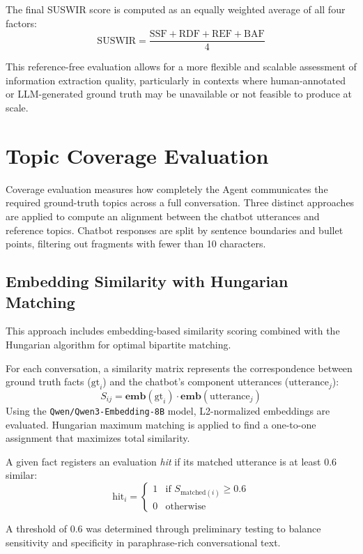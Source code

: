 The final SUSWIR score is computed as an equally weighted average of all four factors:
\[
    \text{SUSWIR} = \frac{\text{SSF} + \text{RDF} + \text{REF} + \text{BAF}}{4}
\]

This reference-free evaluation allows for a more flexible and scalable assessment of information extraction quality, particularly in contexts where human-annotated or LLM-generated ground truth may be unavailable or not feasible to produce at scale.

\section{Topic Coverage Evaluation}

Coverage evaluation measures how completely the Agent communicates the required ground-truth topics across a full conversation. 
Three distinct approaches are applied to compute an alignment between the chatbot utterances and reference topics. 
Chatbot responses are split by sentence boundaries and bullet points, filtering out fragments with fewer than 10 characters.

\subsection{Embedding Similarity with Hungarian Matching}

This approach includes embedding-based similarity scoring combined with the Hungarian algorithm for optimal bipartite matching.

For each conversation, a similarity matrix represents the correspondence between ground truth facts ($\text{gt}_i$) and the chatbot's component utterances ($\text{utterance}_j$):
\[
S_{ij} = \mathbf{emb}(\text{gt}_i) \cdot \mathbf{emb}(\text{utterance}_j)
\]
Using the \texttt{Qwen/Qwen3-Embedding-8B} model, L2-normalized embeddings are evaluated. 
Hungarian maximum matching is applied to find a one-to-one assignment that maximizes total similarity.

A given fact registers an evaluation \textit{hit} if its matched utterance is at least $0.6$ similar:
\[
\text{hit}_i = \begin{cases}
1 & \text{if } S_{\text{matched}(i)} \geq 0.6 \\
0 & \text{otherwise}
\end{cases}
\]

A threshold of $0.6$ was determined through preliminary testing to balance sensitivity and specificity in paraphrase-rich conversational text.

